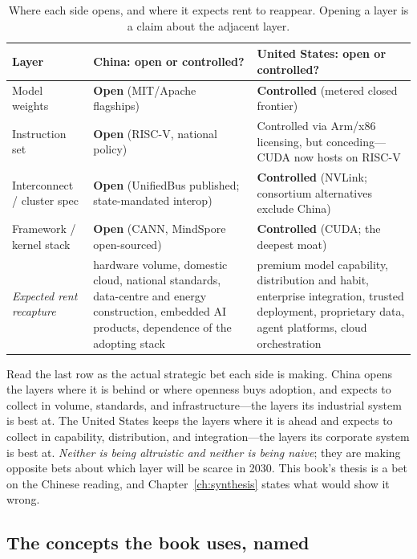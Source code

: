 \begin{table}[htbp]
  \centering
  \small
  \caption{Where each side opens, and where it expects rent to reappear. Opening a layer is a claim about the adjacent layer.}
  \label{tab:rent}
  \begin{tabular}{p{33mm}p{55mm}p{55mm}}
    \toprule
    Layer & China: open or controlled? & United States: open or controlled? \\
    \midrule
    Model weights & \textbf{Open} (MIT/Apache flagships) & \textbf{Controlled} (metered closed frontier) \\
    \addlinespace
    Instruction set & \textbf{Open} (RISC-V, national policy) & Controlled via Arm/x86 licensing, but conceding---CUDA now hosts on RISC-V \\
    \addlinespace
    Interconnect / cluster spec & \textbf{Open} (UnifiedBus published; state-mandated interop) & \textbf{Controlled} (NVLink; consortium alternatives exclude China) \\
    \addlinespace
    Framework / kernel stack & \textbf{Open} (CANN, MindSpore open-sourced) & \textbf{Controlled} (CUDA; the deepest moat) \\
    \addlinespace
    \emph{Expected rent recapture} & hardware volume, domestic cloud, national standards, data-centre and energy construction, embedded AI products, dependence of the adopting stack & premium model capability, distribution and habit, enterprise integration, trusted deployment, proprietary data, agent platforms, cloud orchestration \\
    \bottomrule
  \end{tabular}
\end{table}

Read the last row as the actual strategic bet each side is making. China opens the layers where it is behind or where openness buys adoption, and expects to collect in volume, standards, and infrastructure---the layers its industrial system is best at. The United States keeps the layers where it is ahead and expects to collect in capability, distribution, and integration---the layers its corporate system is best at. \emph{Neither is being altruistic and neither is being naive}; they are making opposite bets about which layer will be scarce in 2030. This book's thesis is a bet on the Chinese reading, and Chapter~\ref{ch:synthesis} states what would show it wrong.

\subsection{The concepts the book uses, named}

